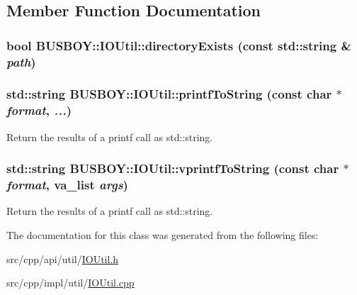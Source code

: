 \subsection{Member Function Documentation}
\hypertarget{classBUSBOY_1_1IOUtil_a6633f30f20c2587d6b91277a90928bbf}{
\subsubsection[{directoryExists}]{\setlength{\rightskip}{0pt plus 5cm}bool BUSBOY::IOUtil::directoryExists (const std::string \& {\em path})}}
\label{classBUSBOY_1_1IOUtil_a6633f30f20c2587d6b91277a90928bbf}
\hypertarget{classBUSBOY_1_1IOUtil_ac2f27ba807ecb6be70fac841e5070e20}{
\subsubsection[{printfToString}]{\setlength{\rightskip}{0pt plus 5cm}std::string BUSBOY::IOUtil::printfToString (const char $\ast$ {\em format}, \/   {\em ...})}}
\label{classBUSBOY_1_1IOUtil_ac2f27ba807ecb6be70fac841e5070e20}


Return the results of a printf call as std::string. \hypertarget{classBUSBOY_1_1IOUtil_a10abc24ad79294cde2c9237e5bce59cc}{
\subsubsection[{vprintfToString}]{\setlength{\rightskip}{0pt plus 5cm}std::string BUSBOY::IOUtil::vprintfToString (const char $\ast$ {\em format}, \/  va\_\-list {\em args})}}
\label{classBUSBOY_1_1IOUtil_a10abc24ad79294cde2c9237e5bce59cc}


Return the results of a printf call as std::string. 

The documentation for this class was generated from the following files:\begin{DoxyCompactItemize}
\item 
src/cpp/api/util/\hyperlink{IOUtil_8h}{IOUtil.h}\item 
src/cpp/impl/util/\hyperlink{IOUtil_8cpp}{IOUtil.cpp}\end{DoxyCompactItemize}
